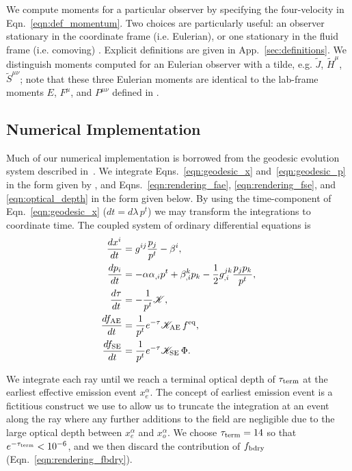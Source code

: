 \documentclass[aps,floatfix,prd,superscriptaddress,twocolumn]{revtex4-1}
\begin{document}
We compute moments for a particular observer
by specifying the four-velocity in Eqn.~\ref{eqn:def_momentum}.
Two choices are particularly useful:
an observer stationary in the coordinate frame (i.e. Eulerian),
or one stationary in the fluid frame (i.e. comoving)
\cite{smar1980-gr_hydro}.
Explicit definitions are given in App.~\ref{sec:definitions}.
We distinguish moments computed for an Eulerian observer with a tilde,
e.g. $\tilde{J}$, $\tilde{H}^\mu$, $\tilde{S}^{\mu\nu}$;
note that these three Eulerian moments are identical to the lab-frame moments
$E$, $F^\mu$, and $P^{\mu\nu}$
defined in
\cite{shib2011-truncated_moment, ocon2015-gr1d_with_nu, fouc2015-m1_nsbh}.

\subsection{Numerical Implementation}
\label{ssec:numerical}
Much of our numerical implementation is borrowed from the geodesic evolution
system described in~\cite{bohn2016-code}.
We integrate Eqns.~\ref{eqn:geodesic_x} and~\ref{eqn:geodesic_p} in the form
given by \citep{hugh1994-eh_finding},
and Eqns.~\ref{eqn:rendering_fae}, \ref{eqn:rendering_fse},
and \ref{eqn:optical_depth} in the form given below.
By using the time-component of Eqn.~\ref{eqn:geodesic_x} ($dt=d\lambda \, p^t$)
we may transform the integrations to coordinate time.
The coupled system of ordinary differential equations is
\begin{align}
  \label{eqn:num_x}
  \frac{dx^i}{dt} &=
  g^{ij} \frac{p_j}{p^t} - \beta^{i},\\
  \label{eqn:num_p}
  \frac{dp_i}{dt} &=
  -\alpha \alpha_{,i} p^t
  + \beta^k_{,i} p_k
  - \frac{1}{2} g^{jk}_{,i}\frac{p_j p_k}{p^t},\\
  \label{eqn:num_tau}
  \frac{d\tau}{dt} &=
  - \frac{1}{p^t}\mathscr{K},\\
  \label{eqn:num_fae}
  \frac{df_{\rm AE}}{dt} &=
  \frac{1}{p^t}e^{-\tau}\mathscr{K_{\rm AE}} \,f^{\rm eq},\\
  \label{eqn:num_fse}
  \frac{df_{\rm SE}}{dt} &=
  \frac{1}{p^t}e^{-\tau}\mathscr{K_{\rm SE}} \,\Phi.
\end{align}

We integrate each ray until we reach a terminal optical depth of
$\tau_{\rm term}$ at the earliest effective emission event $x_e^\alpha$.
The concept of earliest emission event is a fictitious construct we use
to allow us to truncate the integration at an event along the ray where any
further additions to the field are negligible due to the large optical depth
between $x_e^\alpha$ and $x_o^\alpha$.
We choose $\tau_{\rm term}=14$ so that $e^{-\tau_{\rm term}}<10^{-6}$,
and we then discard the contribution of $f_{\rm bdry}$
(Eqn.~\ref{eqn:rendering_fbdry}).
\end{document}
